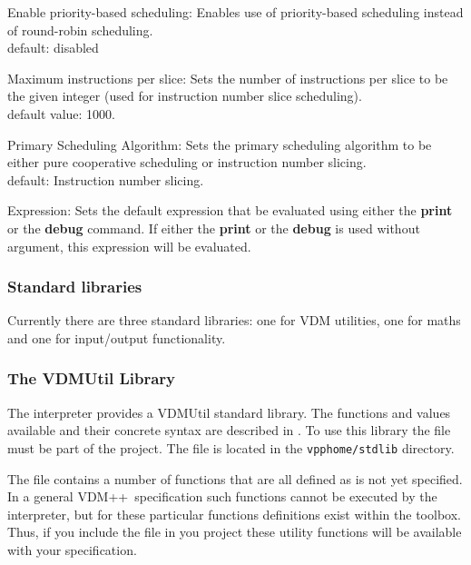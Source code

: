 \documentclass[\pformat,12pt]{article}
\newcommand{\vdmslpp}{VDM++}
\newcommand{\keyw}[1]{{\sf #1}}
\begin{document}
\begin{list}{}{}
\item[\textsf{Enable priority-based scheduling}:] Enables use of
  priority-based scheduling instead of round-robin scheduling.\\
  default: disabled
  
\item[\textsf{Maximum instructions per slice}:]
  Sets the number of instructions per slice to be the given
  integer (used for instruction number slice scheduling).\\
  default value: 1000.

\item[\textsf{Primary Scheduling Algorithm}:]
  Sets the primary scheduling algorithm to be either
  pure cooperative scheduling or instruction number slicing.\\
  default: Instruction number slicing.

\item[\textsf{Expression}:]
  Sets the default expression that be evaluated using
  either the \textbf{print} or the \textbf{debug} command.
  If either the \textbf{print} or the \textbf{debug} is used without argument,
  this expression will be evaluated.

\end{list}



\subsubsection{Standard libraries}\label{subsec:standardlib}

Currently there are three standard libraries: one for VDM utilities, 
one for maths and one
for input/output functionality.

\subsubsection*{The VDMUtil Library}
The interpreter provides a VDMUtil standard library. The functions and
values available and their concrete syntax are described in
\cite{LangMan-SCSK}. To use this library the file
must be part of the project. 
The file is located in the 
{{\tt vpphome/stdlib}} directory.

The  
file contains a number of functions that are all defined as \keyw{is not yet specified}. 
In a general \vdmslpp\ specification such functions cannot be executed by the interpreter, 
but for these particular functions definitions
exist within the toolbox.  Thus, if you include the
file in you project these utility functions will be available with your specification.
\end{document}
